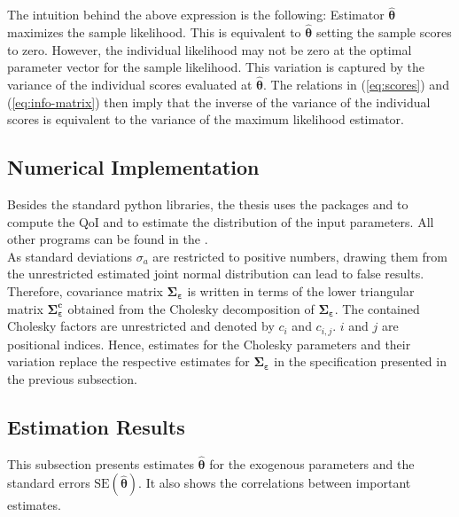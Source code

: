The intuition behind the above expression is the following: Estimator $\pmb{\hat{\theta}}$ maximizes the sample likelihood. This is equivalent to $\pmb{\hat{\theta}}$ setting the sample scores to zero. However, the individual likelihood may not be zero at the optimal parameter vector for the sample likelihood. This variation is captured by the variance of the individual scores evaluated at $\pmb{\hat{\theta}}$. The relations in (\ref{eq:scores}) and (\ref{eq:info-matrix}) then imply that the inverse of the variance of the individual scores is equivalent to the variance of the maximum likelihood estimator.
\subsection{Numerical Implementation}

Besides the standard python libraries, the thesis uses the packages  and  to compute the QoI and to estimate the distribution of the input parameters. All other programs can be found in the  .\\

\noindent
As standard deviations $\sigma_{a}$ are restricted to positive numbers, drawing them from the unrestricted estimated joint normal distribution can lead to false results. Therefore, covariance matrix $\pmb{\Sigma_\varepsilon}$ is written in terms of the lower triangular matrix $\pmb{\Sigma_\varepsilon^c}$ obtained from the Cholesky decomposition of $\pmb{\Sigma_\varepsilon}$. The contained Cholesky factors are unrestricted and denoted by $c_{i}$ and $c_{i,j}$. $i$ and $j$ are positional indices. Hence, estimates for the Cholesky parameters and their variation replace the respective estimates for $\pmb{\Sigma_\varepsilon}$ in the specification presented in the previous subsection.

\subsection{Estimation Results}
This subsection presents estimates $\pmb{\hat{\theta}}$ for the exogenous parameters and the standard errors $\text{SE}(\pmb{\hat{\theta}})$. It also shows the correlations between important estimates.

